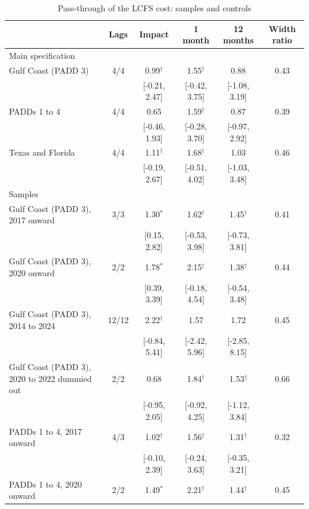 \begin{table}[htbp]
\centering
\caption{Pass-through of the LCFS cost: samples and controls}
\label{tab:california_robust}
\small
\begin{tabular}{lccccc}
\toprule
 & Lags & Impact & 1 month & 12 months & Width ratio \\
\midrule
\multicolumn{6}{l}{Main specification} \\
\midrule
Gulf Coast (PADD 3) & 4/4 & 0.99$^{\dagger}$ & 1.55$^{\dagger}$ & 0.88 & 0.43 \\
\footnotesize  &  & [-0.21, 2.47] & [-0.42, 3.75] & [-1.08, 3.19] &  \\[2pt]
PADDs 1 to 4 & 4/4 & 0.65 & 1.59$^{\dagger}$ & 0.87 & 0.39 \\
\footnotesize  &  & [-0.46, 1.93] & [-0.28, 3.70] & [-0.97, 2.92] &  \\[2pt]
Texas and Florida & 4/4 & 1.11$^{\dagger}$ & 1.68$^{\dagger}$ & 1.03 & 0.46 \\
\footnotesize  &  & [-0.19, 2.67] & [-0.51, 4.02] & [-1.03, 3.48] &  \\[2pt]
\midrule
\multicolumn{6}{l}{Samples} \\
\midrule
Gulf Coast (PADD 3), 2017 onward & 3/3 & 1.30$^{*}$ & 1.62$^{\dagger}$ & 1.45$^{\dagger}$ & 0.41 \\
\footnotesize  &  & [0.15, 2.82] & [-0.53, 3.98] & [-0.73, 3.81] &  \\[2pt]
Gulf Coast (PADD 3), 2020 onward & 2/2 & 1.78$^{*}$ & 2.15$^{\dagger}$ & 1.38$^{\dagger}$ & 0.44 \\
\footnotesize  &  & [0.39, 3.39] & [-0.18, 4.54] & [-0.54, 3.48] &  \\[2pt]
Gulf Coast (PADD 3), 2014 to 2024 & 12/12 & 2.22$^{\dagger}$ & 1.57 & 1.72 & 0.45 \\
\footnotesize  &  & [-0.84, 5.41] & [-2.42, 5.96] & [-2.85, 8.15] &  \\[2pt]
Gulf Coast (PADD 3), 2020 to 2022 dummied out & 2/2 & 0.68 & 1.84$^{\dagger}$ & 1.53$^{\dagger}$ & 0.66 \\
\footnotesize  &  & [-0.95, 2.05] & [-0.92, 4.25] & [-1.12, 3.84] &  \\[2pt]
PADDs 1 to 4, 2017 onward & 4/3 & 1.02$^{\dagger}$ & 1.56$^{\dagger}$ & 1.31$^{\dagger}$ & 0.32 \\
\footnotesize  &  & [-0.10, 2.39] & [-0.24, 3.63] & [-0.35, 3.21] &  \\[2pt]
PADDs 1 to 4, 2020 onward & 2/2 & 1.49$^{*}$ & 2.21$^{\dagger}$ & 1.44$^{\dagger}$ & 0.45 \\

\end{tabular}
\end{table}
